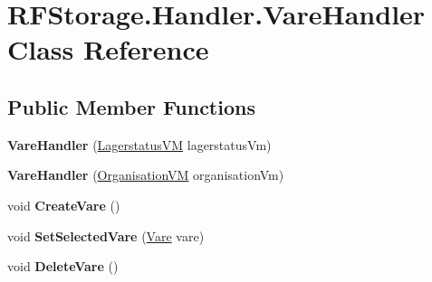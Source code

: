 \hypertarget{class_r_f_storage_1_1_handler_1_1_vare_handler}{}\section{R\+F\+Storage.\+Handler.\+Vare\+Handler Class Reference}
\label{class_r_f_storage_1_1_handler_1_1_vare_handler}
\subsection*{Public Member Functions}
\begin{DoxyCompactItemize}
\item 
\mbox{\label{class_r_f_storage_1_1_handler_1_1_vare_handler_a9ffa5a681ba6a270452d91d8d0acfee1}} 
{\bfseries Vare\+Handler} (\mbox{\hyperlink{class_r_f_storage_1_1_view_model_1_1_lagerstatus_v_m}{Lagerstatus\+VM}} lagerstatus\+Vm)
\item 
\mbox{\label{class_r_f_storage_1_1_handler_1_1_vare_handler_a9771ae225a8e2a40e2e72169e58c3e84}} 
{\bfseries Vare\+Handler} (\mbox{\hyperlink{class_r_f_storage_1_1_view_model_1_1_organisation_v_m}{Organisation\+VM}} organisation\+Vm)
\item 
\mbox{\label{class_r_f_storage_1_1_handler_1_1_vare_handler_a21dda579ed77aa54fb1ebaa689f25579}} 
void {\bfseries Create\+Vare} ()
\item 
\mbox{\label{class_r_f_storage_1_1_handler_1_1_vare_handler_aa264bec39660eb8b39c16cbe6c75204b}} 
void {\bfseries Set\+Selected\+Vare} (\mbox{\hyperlink{class_r_f_storage_1_1_model_1_1_vare}{Vare}} vare)
\item 
\mbox{\label{class_r_f_storage_1_1_handler_1_1_vare_handler_ac3d85459ee3641b359ecda15302f7264}} 
void {\bfseries Delete\+Vare} ()
\end{DoxyCompactItemize}
